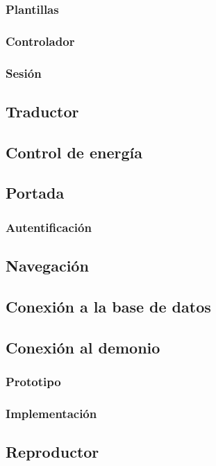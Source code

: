 \subsubsection{Plantillas}
\subsubsection{Controlador}
\subsubsection{Sesión}

\subsection{Traductor}

\subsection{Control de energía}

\subsection{Portada}
\subsubsection{Autentificación}

\subsection{Navegación}

\subsection{Conexión a la base de datos}

\subsection{Conexión al demonio}
\subsubsection{Prototipo}
\subsubsection{Implementación}

\subsection{Reproductor}
